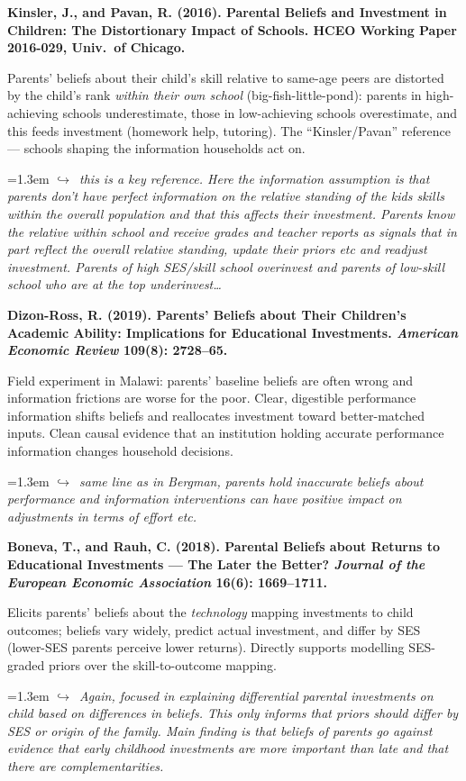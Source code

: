 \documentclass[11pt]{article}
\newcommand{\entry}[3]{%
  \par\medskip\noindent\textbf{#1}\par
  \nopagebreak #2\hspace{0.35em}{\small\color{tagcol}[#3]}\par}
\newcommand{\note}[1]{\par\smallskip\noindent\hangindent=1.3em
  \textcolor{notecol}{\footnotesize$\hookrightarrow$~\textit{#1}}}
\begin{document}
\entry{Kinsler, J., and Pavan, R. (2016). Parental Beliefs and Investment in
Children: The Distortionary Impact of Schools. HCEO Working Paper 2016-029,
Univ.\ of Chicago.}
{Parents' beliefs about their child's skill relative to same-age peers are
distorted by the child's rank \emph{within their own school} (big-fish-little-pond):
parents in high-achieving schools underestimate, those in low-achieving schools
overestimate, and this feeds investment (homework help, tutoring). The
``Kinsler/Pavan'' reference --- schools shaping the information households act on.}{RF / STR}
 \note{this is a key reference. Here the information assumption is that parents don't have perfect information on the relative standing of the kids skills within the overall population and that this affects their investment. Parents know the relative within school and receive grades and teacher reports as signals that in part reflect the overall relative standing, update their priors etc and readjust investment. Parents of high SES/skill school overinvest and parents of low-skill school who are at the top underinvest\dots}

\entry{Dizon-Ross, R. (2019). Parents' Beliefs about Their Children's Academic
Ability: Implications for Educational Investments. \textit{American Economic
Review} 109(8): 2728--65.}
{Field experiment in Malawi: parents' baseline beliefs are often wrong and
information frictions are worse for the poor. Clear, digestible performance
information shifts beliefs and reallocates investment toward better-matched inputs.
Clean causal evidence that an institution holding accurate performance information
changes household decisions.}{EXP}
 \note{same line as in Bergman, parents hold inaccurate beliefs about performance and information interventions can have positive impact on adjustments in terms of effort etc.}

\entry{Boneva, T., and Rauh, C. (2018). Parental Beliefs about Returns to
Educational Investments --- The Later the Better? \textit{Journal of the European
Economic Association} 16(6): 1669--1711.}
{Elicits parents' beliefs about the \emph{technology} mapping investments to child
outcomes; beliefs vary widely, predict actual investment, and differ by SES (lower-SES
parents perceive lower returns). Directly supports modelling SES-graded priors over
the skill-to-outcome mapping.}{EXP / survey}
\note{Again, focused in explaining differential parental investments on child based on differences in beliefs. This only informs that priors should differ by SES or origin of the family. Main finding is that beliefs of parents go against evidence that early childhood investments are more important than late and that there are complementarities. }
\end{document}
